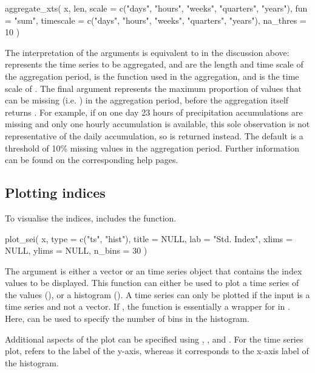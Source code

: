 \documentclass[article,shortnames,nojss]{jss}\usepackage[]{graphicx}\usepackage[]{xcolor}
\begin{document}
\begin{Code}
aggregate_xts(
  x,
  len,
  scale = c("days", "hours", "weeks", "quarters", "years"),
  fun = "sum",
  timescale = c("days", "hours", "weeks", "quarters", "years"),
  na_thres = 10
)
\end{Code}

The interpretation of the arguments is equivalent to in the discussion above:  represents the  time series to be aggregated,  and  are the length and time scale of the aggregation period,  is the function used in the aggregation, and  is the time scale of . The final argument  represents the maximum proportion of values that can be missing (i.e. ) in the aggregation period, before the aggregation itself returns . For example, if on one day 23 hours of precipitation accumulations are missing and only one hourly accumulation is available, this sole observation is not representative of the daily accumulation, so  is returned instead. The default is a threshold of 10\% missing values in the aggregation period. Further information can be found on the corresponding help pages.


\subsection{Plotting indices}

To visualise the indices,  includes the  function.

\begin{Code}
plot_sei(
  x,
  type = c("ts", "hist"),
  title = NULL,
  lab = "Std. Index",
  xlims = NULL,
  ylims = NULL,
  n_bins = 30
)
\end{Code}

The argument  is either a vector or an  time series object that contains the index values to be displayed. This function can either be used to plot a time series of the values (), or a histogram (). A time series can only be plotted if the input  is a time series and not a vector. If , the function is essentially a wrapper for  in . Here,  can be used to specify the number of bins in the histogram.

Additional aspects of the plot can be specified using , ,  and . For the time series plot,  refers to the label of the y-axis, whereas it corresponds to the x-axis label of the histogram.
\end{document}

